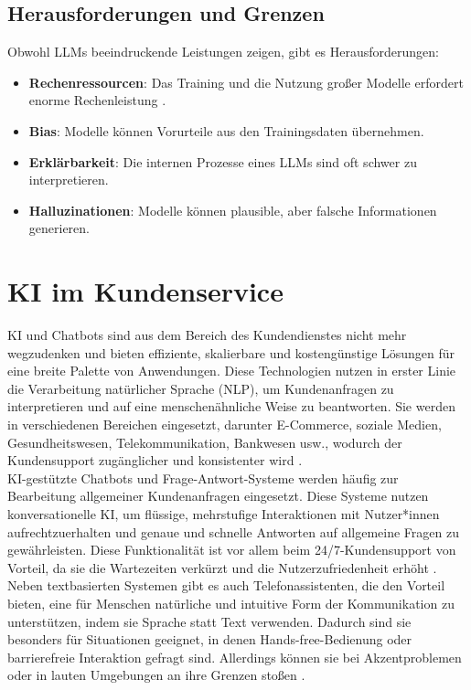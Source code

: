 \documentclass[12pt]{article}
\begin{document}
\subsection{Herausforderungen und Grenzen}
Obwohl LLMs beeindruckende Leistungen zeigen, gibt es Herausforderungen:
\begin{itemize}
    \item \textbf{Rechenressourcen}: Das Training und die Nutzung großer Modelle erfordert enorme Rechenleistung \cite{brown2020}.
    \item \textbf{Bias}: Modelle können Vorurteile aus den Trainingsdaten übernehmen.
    \item \textbf{Erklärbarkeit}: Die internen Prozesse eines LLMs sind oft schwer zu interpretieren.
    \item \textbf{Halluzinationen}: Modelle können plausible, aber falsche Informationen generieren.
\end{itemize}

\section{KI im Kundenservice}

KI und Chatbots sind aus dem Bereich des Kundendienstes nicht mehr wegzudenken und bieten effiziente, skalierbare und kostengünstige Lösungen für eine breite Palette von Anwendungen. Diese Technologien nutzen in erster Linie die Verarbeitung natürlicher Sprache (NLP), um Kundenanfragen zu interpretieren und auf eine menschenähnliche Weise zu beantworten. Sie werden in verschiedenen Bereichen eingesetzt, darunter E-Commerce, soziale Medien, Gesundheitswesen, Telekommunikation, Bankwesen usw., wodurch der Kundensupport zugänglicher und konsistenter wird \cite{liu_towards_2020, hu_touch_2018, oraby_how_2017, mashaabi_natural_2022}.\\

KI-gestützte Chatbots und Frage-Antwort-Systeme werden häufig zur Bearbeitung allgemeiner Kundenanfragen eingesetzt. Diese Systeme nutzen konversationelle KI, um flüssige, mehrstufige Interaktionen mit Nutzer*innen aufrechtzuerhalten und genaue und schnelle Antworten auf allgemeine Fragen zu gewährleisten. Diese Funktionalität ist vor allem beim 24/7-Kundensupport von Vorteil, da sie die Wartezeiten verkürzt und die Nutzerzufriedenheit erhöht \cite{liu_towards_2020, parmar_multiclass_2018, sheehan_customer_2020}.\\

Neben textbasierten Systemen gibt es auch Telefonassistenten, die den Vorteil bieten, eine für Menschen natürliche und intuitive Form der Kommunikation zu unterstützen, indem sie Sprache statt Text verwenden. Dadurch sind sie besonders für Situationen geeignet, in denen Hands-free-Bedienung oder barrierefreie Interaktion gefragt sind. Allerdings können sie bei Akzentproblemen oder in lauten Umgebungen an ihre Grenzen stoßen \cite{roslan_rise_2023}. \\
\end{document}
